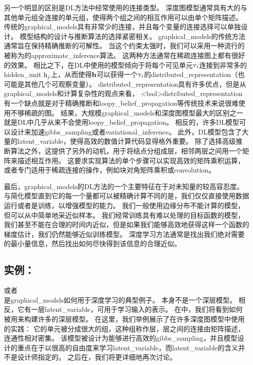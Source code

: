 另一个明显的区别是\gls{DL}方法中经常使用的连接类型。
深度图模型通常具有大的与其他单元组全连接的单元组，使得两个组之间的相互作用可以由单个矩阵描述。
传统的\gls{graphical_models}具有非常少的连接，并且每个变量的连接选择可以单独设计。
模型结构的设计与推断算法的选择紧密相关。
\gls{graphical_models}的传统方法通常旨在保持精确推断的可解性。
当这个约束太强时，我们可以采用一种流行的被称为的\gls{approximate_inference}算法。
这两种方法通常在稀疏连接图上都有很好的效果。
相比之下，在\gls{DL}中使用的模型倾向于将每个可见单元$\mathrm{v}_i$连接到非常多的\gls{hidden_unit} $\mathrm{h}_j$上，从而使得$\mathbf{h}$可以获得一个$\mathrm{v}_i$的\gls{distributed_representation}（也可能是其他几个可观察变量）。
\gls{distributed_representation}具有许多优点，但是从\gls{graphical_models}和计算复杂性的观点来看，
<bad>\gls{distributed_representation}有一个缺点就是对于精确推断和\gls{loopy_belief_propagation}等传统技术来说很难使用不够稀疏的图。
结果，大规模\gls{graphical_models}和深度图模型最大的区别之一就是\gls{DL}中几乎从来不会使用\gls{loopy_belief_propagation}。
相反的，许多\gls{DL}模型可以设计来加速\gls{gibbs_sampling}或者\gls{variational_inference}。
此外，\gls{DL}模型包含了大量的\gls{latent_variable}，使得高效的数值计算代码显得格外重要。
除了选择高级推断算法之外，这提供了另外的动机，用于将结点分组成层，相邻两层之间用一个矩阵来描述相互作用。
这要求实现算法的单个步骤可以实现高效的矩阵乘积运算，或者专门适用于稀疏连接的操作，例如块对角矩阵乘积或\gls{convolution}。



最后，\gls{graphical_models}的\gls{DL}方法的一个主要特征在于对未知量的较高容忍度。
与简化模型直到它的每一个量都可以被精确计算不同的是，我们仅仅直接使用数据运行或者是训练，以增强模型的能力。%
我们一般使用边缘分布不能计算的模型，但可以从中简单地采近似样本。%
我们经常训练具有难以处理的目标函数的模型，我们甚至不能在合理的时间内近似，但是如果我们能够高效地获得这样一个函数的梯度估计，我们仍然能够近似训练模型。
深度学习方法通常是找出我们绝对需要的最小量信息，然后找出如何尽快得到该信息的合理近似。



\subsection{实例：}
\label{sec:example_the_restricted_boltzmann_machine}
\citep{Smolensky86}或者\\ 是\gls{graphical_models}如何用于深度学习的典型例子。 
本身不是一个深层模型。 
相反，它有一层\gls{latent_variable}，可用于学习输入的表示。 
在中，我们将看到如何被用来构建许多的深层模型。
在这里，我们举例展示了在许多深度图模型中使用的实践：
它的单元被分成很大的组，这种组称作层，层之间的连接由矩阵描述，连通性相对密集。
该模型被设计为能够进行高效的\gls{gibbs_sampling}，并且模型设计的重点在于以很高的自由度来学习\gls{latent_variable}，而\gls{latent_variable}的含义并不是设计师指定的。
之后在，我们将更详细地再次讨论。


